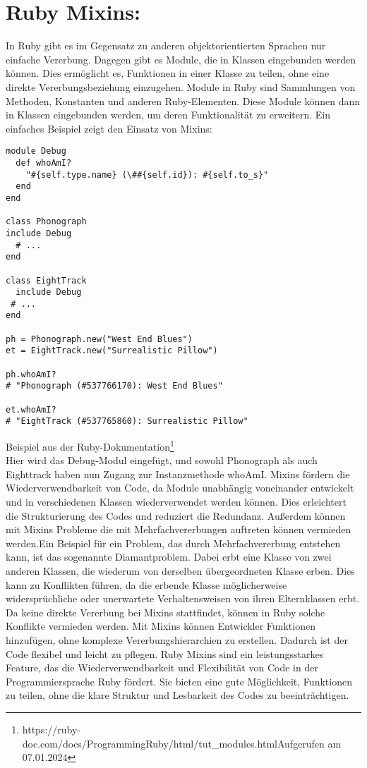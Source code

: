 \documentclass{article}
\begin{document}
\section*{Ruby Mixins:}
In Ruby gibt es im Gegensatz zu anderen objektorientierten Sprachen nur einfache Vererbung.
Dagegen gibt es Module, die in Klassen eingebunden werden können. Dies ermöglicht es, Funktionen in einer Klasse zu teilen, ohne eine direkte Vererbungsbeziehung einzugehen.
Module in Ruby sind Sammlungen von Methoden, Konstanten und anderen Ruby-Elementen. Diese Module können dann in Klassen eingebunden werden, um deren Funktionalität zu erweitern.
Ein einfaches Beispiel zeigt den Einsatz von Mixins:
\begin{lstlisting}
module Debug 
  def whoAmI?  
    "#{self.type.name} (\##{self.id}): #{self.to_s}"  
  end  
end 

class Phonograph 
include Debug  
  # ...  
end  

class EightTrack  
  include Debug 
 # ...  
end 

ph = Phonograph.new("West End Blues")  
et = EightTrack.new("Surrealistic Pillow") 

ph.whoAmI? 
# "Phonograph (#537766170): West End Blues" 

et.whoAmI? 
# "EightTrack (#537765860): Surrealistic Pillow"
\end{lstlisting}
Beispiel aus der Ruby-Dokumentation\footnote{https://ruby-doc.com/docs/ProgrammingRuby/html/tut\_modules.htmlAufgerufen am 07.01.2024}\\ 
Hier wird das Debug-Modul eingefügt, und sowohl Phonograph als auch Eighttrack haben nun Zugang zur Instanzmethode whoAmI.
Mixins fördern die Wiederverwendbarkeit von Code, da Module unabhängig voneinander entwickelt und in verschiedenen Klassen wiederverwendet werden können. Dies erleichtert die Strukturierung des Codes und reduziert die Redundanz. Außerdem können mit Mixins Probleme die mit Mehrfachvererbungen auftreten können vermieden werden.Ein Beispiel für ein Problem, das durch Mehrfachvererbung entstehen kann, ist das sogenannte Diamantproblem. Dabei erbt eine Klasse von zwei anderen Klassen, die wiederum von derselben übergeordneten Klasse erben. Dies kann zu Konflikten führen, da die erbende Klasse möglicherweise widersprüchliche oder unerwartete Verhaltensweisen von ihren Elternklassen erbt. Da keine direkte Vererbung bei Mixins stattfindet, können in Ruby solche Konflikte vermieden werden.
Mit Mixins können Entwickler Funktionen hinzufügen, ohne komplexe Vererbungshierarchien zu erstellen. Dadurch ist der Code flexibel und leicht zu pflegen. Ruby Mixins sind ein leistungsstarkes Feature, das die Wiederverwendbarkeit und Flexibilität von Code in der Programmiersprache Ruby fördert. Sie bieten eine gute Möglichkeit, Funktionen zu teilen, ohne die klare Struktur und Lesbarkeit des Codes zu beeinträchtigen.
\end{document}
